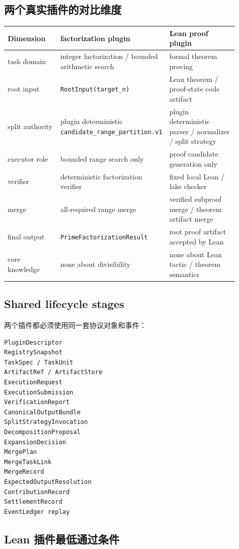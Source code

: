 \documentclass[11pt]{ctexart}
\begin{document}
\subsection{两个真实插件的对比维度}

\begin{longtable}{p{0.24\linewidth}p{0.33\linewidth}p{0.33\linewidth}}
\toprule
Dimension & factorization plugin & Lean proof plugin \\
\midrule
task domain & integer factorization / bounded arithmetic search & formal theorem proving \\
root input & \texttt{RootInput(target\_n)} & Lean theorem / proof-state code artifact \\
split authority & plugin deterministic \texttt{candidate\_range\_partition.v1} & plugin deterministic parser / normalizer / split strategy \\
executor role & bounded range search only & proof candidate generation only \\
verifier & deterministic factorization verifier & fixed local Lean / lake checker \\
merge & all-required range merge & verified subproof merge / theorem artifact merge \\
final output & \texttt{PrimeFactorizationResult} & root proof artifact accepted by Lean \\
core knowledge & none about divisibility & none about Lean tactic / theorem semantics \\
\bottomrule
\end{longtable}

\subsection{Shared lifecycle stages}

两个插件都必须使用同一套协议对象和事件：

\begin{lstlisting}
PluginDescriptor
RegistrySnapshot
TaskSpec / TaskUnit
ArtifactRef / ArtifactStore
ExecutionRequest
ExecutionSubmission
VerificationReport
CanonicalOutputBundle
SplitStrategyInvocation
DecompositionProposal
ExpansionDecision
MergePlan
MergeTaskLink
MergeRecord
ExpectedOutputResolution
ContributionRecord
SettlementRecord
EventLedger replay
\end{lstlisting}

\subsection{Lean 插件最低通过条件}
\end{document}
